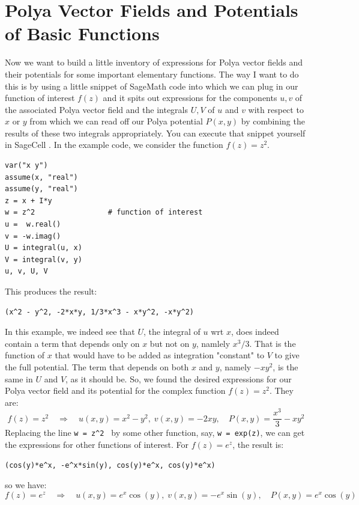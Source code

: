 \documentclass[12pt]{article}
\begin{document}

\section{Polya Vector Fields and Potentials of Basic Functions}
Now we want to build a little inventory of expressions for Polya vector fields and their potentials for some important elementary functions. The way I want to do this is by using a little snippet of SageMath code into which we can plug in our function of interest $f(z)$ and it spits out expressions for the components $u,v$ of the associated Polya vector field and the integrals $U,V$ of $u$ and $v$ with respect to $x$ or $y$ from which we can read off our Polya potential $P(x,y)$ by combining the results of these two integrals appropriately. You can execute that snippet yourself in SageCell \cite{SageCell}. In the example code, we consider the function $f(z) = z^2$.
\begin{verbatim}
var("x y")
assume(x, "real")
assume(y, "real")
z = x + I*y
w = z^2                 # function of interest
u =  w.real() 
v = -w.imag()
U = integral(u, x)
V = integral(v, y)
u, v, U, V	
\end{verbatim}
This produces the result:
\begin{verbatim}
(x^2 - y^2, -2*x*y, 1/3*x^3 - x*y^2, -x*y^2)
\end{verbatim}
In this example, we indeed see that $U$, the integral of $u$ wrt $x$, does indeed contain a term that depends only on $x$ but not on $y$, namlely $x^3/3$. That is the function of $x$ that would have to be added as integration "constant" to $V$ to give the full potential. The term that depends on both $x$ and $y$, namely $-x y^2$, is the same in $U$ and $V$, as it should be. So, we found the desired expressions for our Polya vector field and its potential for the complex function $f(z) = z^2$. They are:
\begin{equation}
f(z) = z^2 \quad \Rightarrow \quad
u(x,y) = x^2 - y^2, \; 
v(x,y) = -2 x y, \quad 
P(x,y) = \frac{x^3}{3} -x y^2
\end{equation}
Replacing the line \texttt{w = z\textasciicircum2 } by some other function, say, \texttt{w = exp(z)}, we can get the expressions for other functions of interest. For $f(z) = e^z$, the result is:
\begin{verbatim}
(cos(y)*e^x, -e^x*sin(y), cos(y)*e^x, cos(y)*e^x)
\end{verbatim}
so we have:
\begin{equation}
f(z) = e^z \quad \Rightarrow \quad
u(x,y) =  e^x \cos(y), \; 
v(x,y) = -e^x \sin(y), \quad 
P(x,y) =  e^x \cos(y)
\end{equation}
\end{document}
